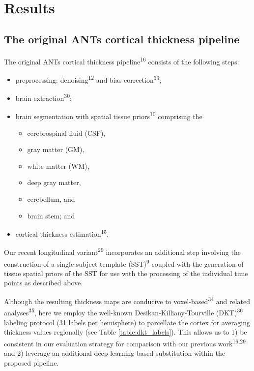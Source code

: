\documentclass[12pt,]{article}
\providecommand{\tightlist}{%
  \setlength{\itemsep}{0pt}\setlength{\parskip}{0pt}}
\begin{document}
\hypertarget{results}{%
\section*{Results}\label{results}}

\hypertarget{the-original-ants-cortical-thickness-pipeline}{%
\subsection*{The original ANTs cortical thickness
pipeline}\label{the-original-ants-cortical-thickness-pipeline}}

The original ANTs cortical thickness pipeline\textsuperscript{16}
consists of the following steps:

\begin{itemize}
\tightlist
\item
  preprocessing: denoising\textsuperscript{12} and bias
  correction\textsuperscript{33};
\item
  brain extraction\textsuperscript{30};
\item
  brain segmentation with spatial tissue priors\textsuperscript{10}
  comprising the

  \begin{itemize}
  \tightlist
  \item
    cerebrospinal fluid (CSF),
  \item
    gray matter (GM),
  \item
    white matter (WM),
  \item
    deep gray matter,
  \item
    cerebellum, and
  \item
    brain stem; and
  \end{itemize}
\item
  cortical thickness estimation\textsuperscript{15}.
\end{itemize}

Our recent longitudinal variant\textsuperscript{29} incorporates an
additional step involving the construction of a single subject template
(SST)\textsuperscript{9} coupled with the generation of tissue spatial
priors of the SST for use with the processing of the individual time
points as described above.

Although the resulting thickness maps are conducive to
voxel-based\textsuperscript{34} and related
analyses\textsuperscript{35}, here we employ the well-known
Desikan-Killiany-Tourville (DKT)\textsuperscript{36} labeling protocol
(31 labels per hemisphere) to parcellate the cortex for averaging
thickness values regionally (see Table \ref{table:dkt_labels}). This
allows us to 1) be consistent in our evaluation strategy for comparison
with our previous work\textsuperscript{16,29} and 2) leverage an
additional deep learning-based substitution within the proposed
pipeline.
\end{document}
